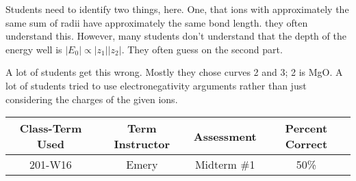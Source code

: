 \begin{outcomes}

Students need to identify two things, here. One, that ions with approximately the same sum of radii have approximately the same bond length. they often understand this. However, many students don't understand that the depth of the energy well is $|E_{\text{0}}| \propto |z_{\text{1}}||z_{\text{2}}|$. They often guess on the second part.

A lot of students get this wrong. Mostly they chose curves 2 and 3; 2 is MgO. A lot of students tried to use electronegativity arguments rather than just considering the charges of the given ions.

	\begin{center}
		\begin{tabular}{cccc}
			\hline\hline
			Class-Term Used & Term Instructor & Assessment & Percent Correct\\
			\hline
			201-W16 & Emery & Midterm \#1 & 50\%\\
			\hline
		\end{tabular}
	\end{center}

\end{outcomes}

\begin{comments}

\end{comments}
